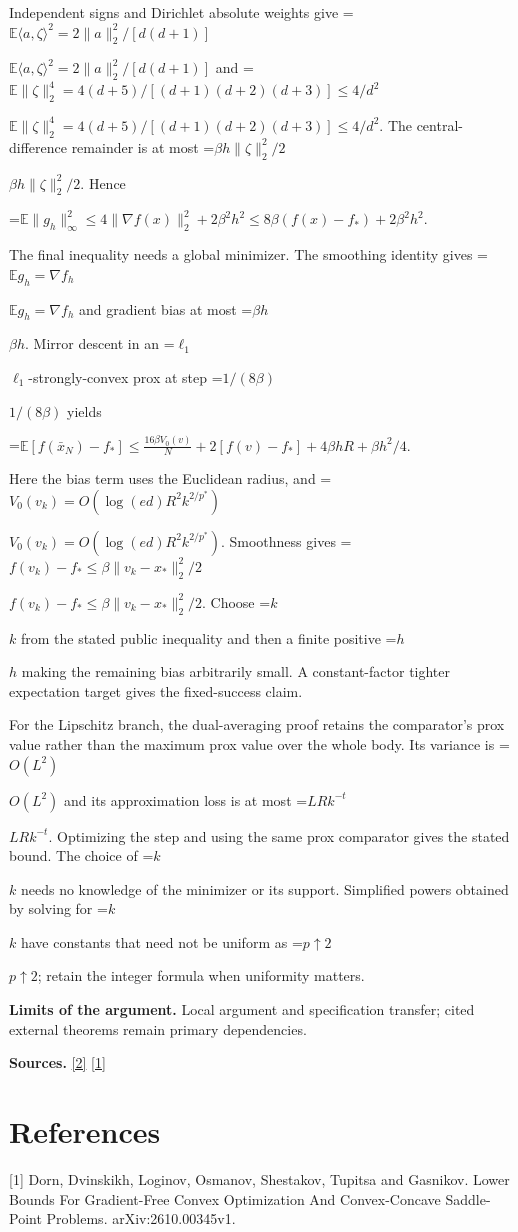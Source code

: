 \documentclass[10pt,a4paper]{article}
\newcommand{\AtlasMath}[1]{\par\begingroup\centering\setbox0=\hbox{$\displaystyle #1$}\ifdim\wd0>1.4\linewidth\typeout{ATLAS WIDE FORMULA: \the\wd0}\fi\ifdim\wd0>\linewidth\resizebox{\linewidth}{!}{\box0}\else\box0\fi\par\endgroup}
\newcommand{\AtlasInlineMath}[1]{\begingroup\setbox0=\hbox{$#1$}\ifdim\wd0>.4\linewidth\endgroup\AtlasMath{#1}\else\endgroup$#1$\fi}
\begin{document}
Independent signs and Dirichlet absolute weights give \AtlasInlineMath{\mathbb E\langle a,\zeta\rangle^2=2\|a\|_2^2/[d(d+1)]} and \AtlasInlineMath{\mathbb E\|\zeta\|_2^4=4(d+5)/[(d+1)(d+2)(d+3)]\le4/d^2}. The central-difference remainder is at most \AtlasInlineMath{\beta h\|\zeta\|_2^2/2}. Hence

\AtlasMath{\mathbb E\|g_h\|_\infty^2\le4\|\nabla f(x)\|_2^2+2\beta^2h^2\le8\beta(f(x)-f_*)+2\beta^2h^2.}

The final inequality needs a global minimizer. The smoothing identity gives \AtlasInlineMath{\mathbb E g_h=\nabla f_h} and gradient bias at most \AtlasInlineMath{\beta h}. Mirror descent in an \AtlasInlineMath{\ell_1}-strongly-convex prox at step \AtlasInlineMath{1/(8\beta)} yields

\AtlasMath{\mathbb E[f(\bar x_N)-f_*]\le\frac{16\beta V_0(v)}N+2[f(v)-f_*]+4\beta hR+\beta h^2/4.}

Here the bias term uses the Euclidean radius, and \AtlasInlineMath{V_0(v_k)=O(\log(ed)R^2k^{2/p^*})}. Smoothness gives \AtlasInlineMath{f(v_k)-f_*\le\beta\|v_k-x_*\|_2^2/2}. Choose \AtlasInlineMath{k} from the stated public inequality and then a finite positive \AtlasInlineMath{h} making the remaining bias arbitrarily small. A constant-factor tighter expectation target gives the fixed-success claim.

For the Lipschitz branch, the dual-averaging proof retains the comparator's prox value rather than the maximum prox value over the whole body. Its variance is \AtlasInlineMath{O(L^2)} and its approximation loss is at most \AtlasInlineMath{LRk^{-t}}. Optimizing the step and using the same prox comparator gives the stated bound. The choice of \AtlasInlineMath{k} needs no knowledge of the minimizer or its support. Simplified powers obtained by solving for \AtlasInlineMath{k} have constants that need not be uniform as \AtlasInlineMath{p\uparrow2}; retain the integer formula when uniformity matters.

\textbf{Limits of the argument.} Local argument and specification transfer; cited external theorems remain primary dependencies.

\textbf{Sources.} \href{https://proceedings.neurips.cc/paper_files/paper/2022/file/329ef22fd8cb68223d5df09a037f7dd9-Paper-Conference.pdf}{[2]} \href{https://arxiv.org/html/2610.00345v1}{[1]}

\section{References}
[1] Dorn, Dvinskikh, Loginov, Osmanov, Shestakov, Tupitsa and Gasnikov. Lower Bounds For Gradient-Free Convex Optimization And Convex-Concave Saddle-Point Problems. arXiv:2610.00345v1.
\end{document}
